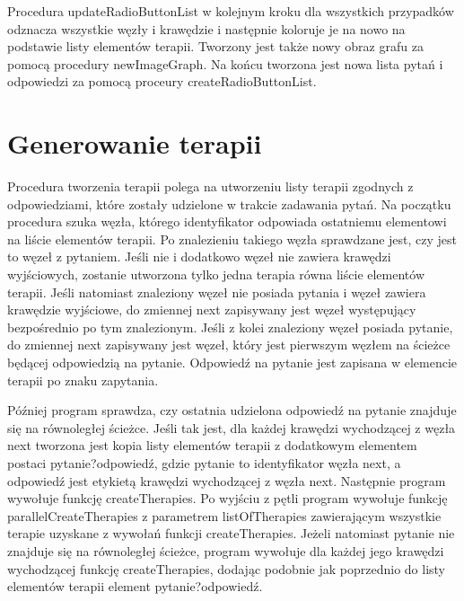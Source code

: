 \documentclass[oneside,a4paper]{book}
\begin{document}
\begin{spacing}{1.5}
Procedura updateRadioButtonList w kolejnym kroku dla wszystkich przypadków odznacza wszystkie węzły i krawędzie i następnie koloruje je na nowo na podstawie listy elementów terapii. Tworzony jest także nowy obraz grafu za pomocą procedury newImageGraph. Na końcu tworzona jest nowa lista pytań i odpowiedzi za pomocą proceury createRadioButtonList. 

\section{Generowanie terapii}

Procedura tworzenia terapii polega na utworzeniu listy terapii zgodnych z odpowiedziami, które zostały udzielone w trakcie zadawania pytań. Na początku procedura szuka węzła, którego identyfikator odpowiada ostatniemu elementowi na liście elementów terapii. Po znalezieniu takiego węzła sprawdzane jest, czy jest to węzeł z pytaniem. Jeśli nie i dodatkowo węzeł nie zawiera krawędzi wyjściowych, zostanie utworzona tylko jedna terapia równa liście elementów terapii. Jeśli natomiast znaleziony węzeł nie posiada pytania i węzeł zawiera krawędzie wyjściowe, do zmiennej next zapisywany jest węzeł występujący bezpośrednio po tym znalezionym. Jeśli z kolei znaleziony węzeł posiada pytanie, do zmiennej next zapisywany jest węzeł, który jest pierwszym węzłem na ścieżce będącej odpowiedzią na pytanie. Odpowiedź na pytanie jest zapisana w elemencie terapii po znaku zapytania.

Później program sprawdza, czy ostatnia udzielona odpowiedź na pytanie znajduje się na równoległej ścieżce. Jeśli tak jest, dla każdej krawędzi wychodzącej z węzła next tworzona jest kopia listy elementów terapii z dodatkowym elementem postaci pytanie?odpowiedź, gdzie pytanie to identyfikator węzła next, a odpowiedź jest etykietą krawędzi wychodzącej z węzła next. Następnie program wywołuje funkcję createTherapies. Po wyjściu z pętli program wywołuje funkcję parallelCreateTherapies z parametrem listOfTherapies zawierającym wszystkie terapie uzyskane z wywołań funkcji createTherapies. Jeżeli natomiast pytanie nie znajduje się na równoległej ścieżce, program wywołuje dla każdej jego krawędzi wychodzącej funkcję createTherapies, dodając podobnie jak poprzednio do listy elementów terapii element pytanie?odpowiedź. 


\end{spacing}
\end{document}
